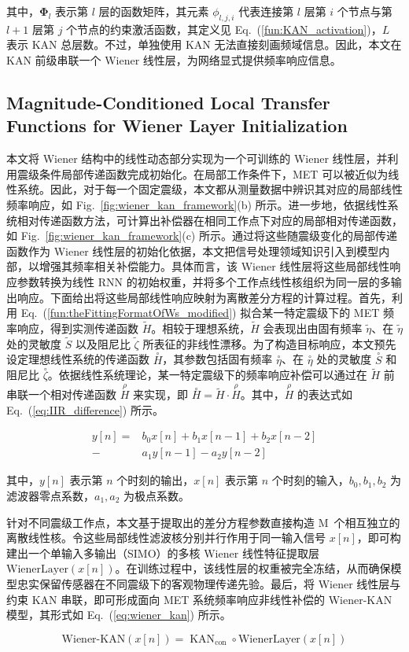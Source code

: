 \documentclass[sn-nature]{sn-jnl}
\newif\ifCNENEnglish
\newif\ifCNENBilingual
\newcommand{\CNEN}[2]{%
    \ifCNENBilingual
        #1%
        \if\relax\detokenize{#2}\relax\else\par #2\fi%
    \else
        \ifCNENEnglish
            #2%
        \else
            #1%
        \fi
    \fi
}
\newcommand{\fn}{\eta} %
\newcommand{\Sen}{S} %
\newcommand{\mmax}{M} %
\newcommand{\relative}[1]{\overset{\rho}{#1}} %
\newcommand{\ideal}[1]{\overset{\circ}{#1}} %
\newcommand{\exam}[1]{\tilde{#1}} %
\begin{document}
\CNEN{其中，$\bm{\Phi}_l$ 表示第 $l$ 层的函数矩阵，其元素 $\phi_{l,j,i}$ 代表连接第 $l$ 层第 $i$ 个节点与第 $l+1$ 层第 $j$ 个节点的约束激活函数，其定义见 Eq.~(\ref{fun:KAN_activation})，$L$ 表示 KAN 总层数。不过，单独使用 KAN 无法直接刻画频域信息。因此，本文在 KAN 前级串联一个 Wiener 线性层，为网络显式提供频率响应信息。}{}
\subsection{Magnitude-Conditioned Local Transfer Functions for Wiener Layer Initialization}

\CNEN{本文将 Wiener 结构中的线性动态部分实现为一个可训练的 Wiener 线性层，并利用震级条件局部传递函数完成初始化。在局部工作条件下，MET 可以被近似为线性系统。因此，对于每一个固定震级，本文都从测量数据中辨识其对应的局部线性频率响应，如 Fig.~\ref{fig:wiener_kan_framework}(b) 所示。进一步地，依据线性系统相对传递函数方法，可计算出补偿器在相同工作点下对应的局部相对传递函数，如 Fig.~\ref{fig:wiener_kan_framework}(c) 所示。通过将这些随震级变化的局部传递函数作为 Wiener 线性层的初始化依据，本文把信号处理领域知识引入到模型内部，以增强其频率相关补偿能力。具体而言，该 Wiener 线性层将这些局部线性响应参数转换为线性 RNN 的初始权重，并将多个工作点线性核组织为同一层的多输出响应。下面给出将这些局部线性响应映射为离散差分方程的计算过程。首先，利用 Eq.~(\ref{fun:theFittingFormatOfWs_modified}) 拟合某一特定震级下的 MET 频率响应，得到实测传递函数 $\exam{H}$。相较于理想系统，$\exam{H}$ 会表现出由固有频率 $\exam{\fn}$、在 $\exam{\fn}$ 处的灵敏度 $\exam{\Sen}$ 以及阻尼比 $\exam{\zeta}$ 所表征的非线性漂移。为了构造目标响应，本文预先设定理想线性系统的传递函数 $\ideal{H}$，其参数包括固有频率 $\ideal{\fn}$、在 $\ideal{\fn}$ 处的灵敏度 $\ideal{S}$ 和阻尼比 $\ideal{\zeta}$。依据线性系统理论，某一特定震级下的频率响应补偿可以通过在 $\exam{H}$ 前串联一个相对传递函数 $\relative{H}$ 来实现，即 $\ideal{H} = \exam{H} \cdot \relative{H}$。其中，$\relative{H}$ 的表达式如 Eq.~(\ref{eq:IIR_difference}) 所示。}{}\begin{equation}
    \begin{aligned}
        y[n]  = & b_0 x[n] + b_1 x[n-1] + b_2 x[n-2] \\
              - & a_1 y[n-1] - a_2 y[n-2]
    \end{aligned}
    \label{eq:IIR_difference}
\end{equation}

\CNEN{其中，$y[n]$ 表示第 $n$ 个时刻的输出，$x[n]$ 表示第 $n$ 个时刻的输入，$b_0,b_1,b_2$ 为滤波器零点系数，$a_1,a_2$ 为极点系数。}{}
\CNEN{针对不同震级工作点，本文基于提取出的差分方程参数直接构造 \mmax~个相互独立的离散线性核。令这些局部线性滤波核分别并行作用于同一输入信号 $x[n]$，即可构建出一个单输入多输出（SIMO）的多核 Wiener 线性特征提取层 $\mathrm{WienerLayer}(x[n])$。在训练过程中，该线性层的权重被完全冻结，从而确保模型忠实保留传感器在不同震级下的客观物理传递先验。最后，将 Wiener 线性层与约束 KAN 串联，即可形成面向 MET 系统频率响应非线性补偿的 Wiener-KAN 模型，其形式如 Eq.~(\ref{eq:wiener_kan}) 所示。}{}
\begin{equation}
    \text{Wiener-KAN}(x[n]) = \operatorname{KAN}_{\text{con}} \circ \mathrm{Wi
enerLayer}(x[n])    \label{eq:wiener_kan}
\end{equation}
\end{document}
